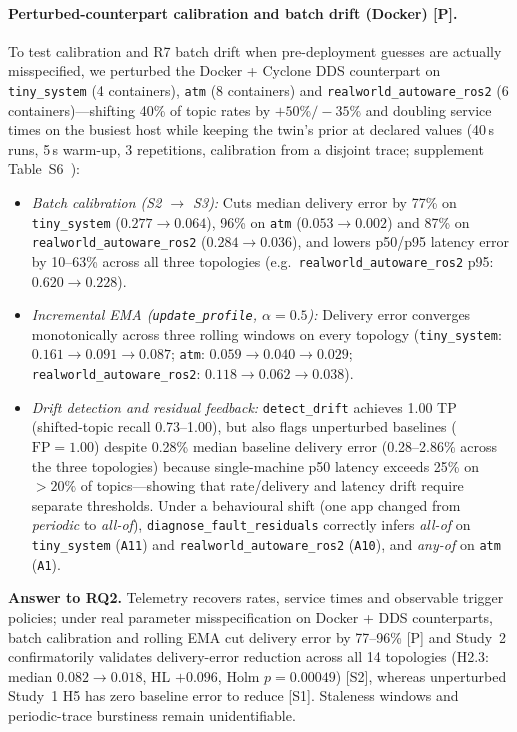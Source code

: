 \paragraph{Perturbed-counterpart calibration and batch drift (Docker) [P].} To test calibration and R7 batch drift when pre-deployment guesses are actually misspecified, we perturbed the Docker + Cyclone DDS counterpart on \texttt{tiny\_system} (4 containers), \texttt{atm} (8 containers) and \texttt{realworld\_\allowbreak autoware\_\allowbreak ros2} (6 containers)---shifting 40\% of topic rates by $+50\% / -35\%$ and doubling service times on the busiest host while keeping the twin's prior at declared values (40\,s runs, 5\,s warm-up, 3 repetitions, calibration from a disjoint trace; supplement Table~S6~\citealp{sag-software}):
\begin{itemize}[leftmargin=*,nosep]
  \item \emph{Batch calibration (S2 $\to$ S3):} Cuts median delivery error by 77\% on \texttt{tiny\_system} ($0.277 \to 0.064$), 96\% on \texttt{atm} ($0.053 \to 0.002$) and 87\% on \texttt{realworld\_\allowbreak autoware\_\allowbreak ros2} ($0.284 \to 0.036$), and lowers p50/p95 latency error by 10--63\% across all three topologies (e.g.\ \texttt{realworld\_\allowbreak autoware\_\allowbreak ros2} p95: $0.620 \to 0.228$).
  \item \emph{Incremental EMA (\texttt{update\_profile}, $\alpha = 0.5$):} Delivery error converges monotonically across three rolling windows on every topology (\texttt{tiny\_system}: $0.161 \to 0.091 \to 0.087$; \texttt{atm}: $0.059 \to 0.040 \to 0.029$; \texttt{realworld\_\allowbreak autoware\_\allowbreak ros2}: $0.118 \to 0.062 \to 0.038$).
  \item \emph{Drift detection and residual feedback:} \texttt{detect\_drift} achieves 1.00 TP (shifted-topic recall 0.73--1.00), but also flags unperturbed baselines ($\text{FP} = 1.00$) despite 0.28\% median baseline delivery error (0.28--2.86\% across the three topologies) because single-machine p50 latency exceeds 25\% on $>20\%$ of topics---showing that rate/delivery and latency drift require separate thresholds. Under a behavioural shift (one app changed from \emph{periodic} to \emph{all-of}), \texttt{diagnose\_fault\_residuals} correctly infers \emph{all-of} on \texttt{tiny\_system} (\texttt{A11}) and \texttt{realworld\_\allowbreak autoware\_\allowbreak ros2} (\texttt{A10}), and \emph{any-of} on \texttt{atm} (\texttt{A1}).
\end{itemize}

\textbf{Answer to RQ2.} Telemetry recovers rates, service times and observable trigger policies; under real parameter misspecification on Docker + DDS counterparts, batch calibration and rolling EMA cut delivery error by 77--96\% [P] and Study~2 confirmatorily validates delivery-error reduction across all 14 topologies (H2.3: median $0.082 \to 0.018$, HL $+0.096$, Holm $p = 0.00049$) [S2], whereas unperturbed Study~1 H5 has zero baseline error to reduce [S1]. Staleness windows and periodic-trace burstiness remain unidentifiable.

